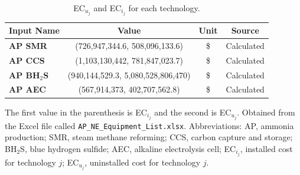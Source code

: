 \documentclass{article}
\begin{document}
\begin{table}[H]
  \centering
  \caption{EC$_{u_j}$ and EC$_{i_j}$ for each technology.}
  \label{table:ec_values}
  \begin{threeparttable}
    \begin{tabular}{@{}lccc@{}}
      \toprule
      \textbf{Input Name} & \textbf{Value} & \textbf{Unit} & \textbf{Source} \\ \midrule
      \textbf{AP SMR} & (726,947,344.6, 508,096,133.6) & \$ & Calculated \\
      \textbf{AP CCS} & (1,103,130,442, 781,847,023.7) & \$ & Calculated \\
      \textbf{AP BH$_2$S} & (940,144,529.3, 5,080,528,806,470) & \$ & Calculated \\
      \textbf{AP AEC} & (567,914,373, 402,707,562.8) & \$ & Calculated \\ \bottomrule
    \end{tabular}
\begin{tablenotes}
  \small
  \item The first value in the parenthesis is EC$_{i_j}$ and the second is EC$_{u_j}$. Obtained from the Excel file called \texttt{AP\_NE\_Equipment\_List.xlsx}. Abbreviations: AP, ammonia production; SMR, steam methane reforming; CCS, carbon capture and storage; BH$_2$S, blue hydrogen sulfide; AEC, alkaline electrolysis cell; EC$_{i_j}$, installed cost for technology $j$; EC$_{u_j}$, uninstalled cost for technology $j$.
\end{tablenotes}

  \end{threeparttable}
\end{table}
\end{document}
